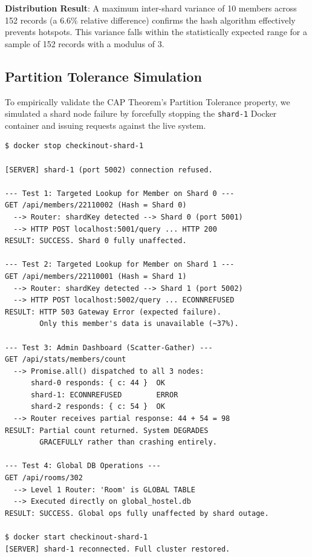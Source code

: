 \documentclass[sigconf]{acmart}
\begin{document}
\textbf{Distribution Result}: A maximum inter-shard variance of 10 members across 152 records (a 6.6\% relative difference) confirms the hash algorithm effectively prevents hotspots. This variance falls within the statistically expected range for a sample of 152 records with a modulus of 3.

\subsection{Partition Tolerance Simulation}

To empirically validate the CAP Theorem's Partition Tolerance property, we simulated a shard node failure by forcefully stopping the \texttt{shard-1} Docker container and issuing requests against the live system.

\begin{lstlisting}[style=logstyle, caption={Partition Failure Simulation: Shard-1 Node Outage}]
$ docker stop checkinout-shard-1

[SERVER] shard-1 (port 5002) connection refused.

--- Test 1: Targeted Lookup for Member on Shard 0 ---
GET /api/members/22110002 (Hash = Shard 0)
  --> Router: shardKey detected --> Shard 0 (port 5001)
  --> HTTP POST localhost:5001/query ... HTTP 200
RESULT: SUCCESS. Shard 0 fully unaffected.

--- Test 2: Targeted Lookup for Member on Shard 1 ---
GET /api/members/22110001 (Hash = Shard 1)
  --> Router: shardKey detected --> Shard 1 (port 5002)
  --> HTTP POST localhost:5002/query ... ECONNREFUSED
RESULT: HTTP 503 Gateway Error (expected failure).
        Only this member's data is unavailable (~37%).

--- Test 3: Admin Dashboard (Scatter-Gather) ---
GET /api/stats/members/count
  --> Promise.all() dispatched to all 3 nodes:
      shard-0 responds: { c: 44 }  OK
      shard-1: ECONNREFUSED        ERROR
      shard-2 responds: { c: 54 }  OK
  --> Router receives partial response: 44 + 54 = 98
RESULT: Partial count returned. System DEGRADES
        GRACEFULLY rather than crashing entirely.

--- Test 4: Global DB Operations ---
GET /api/rooms/302
  --> Level 1 Router: 'Room' is GLOBAL TABLE
  --> Executed directly on global_hostel.db
RESULT: SUCCESS. Global ops fully unaffected by shard outage.

$ docker start checkinout-shard-1
[SERVER] shard-1 reconnected. Full cluster restored.
\end{lstlisting}
\end{document}
